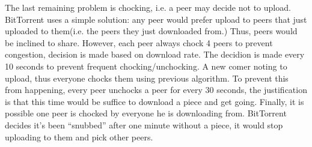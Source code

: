 The last remaining problem is chocking, i.e. a peer may decide not to upload.
BitTorrent uses a simple solution: any peer would prefer upload to peers that just uploaded to them(i.e. the peers they just downloaded from.)
Thus, peers would be inclined to share.
However, each peer always chock 4 peers to prevent congestion, decision is made based on download rate.
The decidion is made every 10 seconds to prevent frequent chocking/unchocking.
A new comer noting to upload, thus everyone chocks them using previous algorithm.
To prevent this from happening, every peer unchocks a peer for every 30 seconds, the justification is that this time would be suffice to download a piece and get going.
Finally, it is possible one peer is chocked by everyone he is downloading from.
BitTorrent decides it's been ``snubbed'' after one minute without a piece, it would stop uploading to them and pick other peers.

